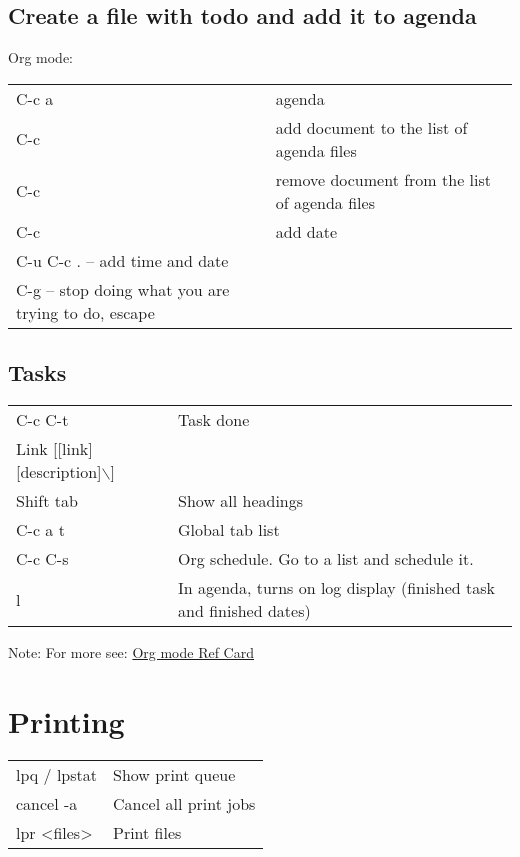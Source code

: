 \documentclass[11pt]{article}
\begin{document}
\subsection{Create a file with todo and add it to agenda}
\label{sec:org3df95be}
Org mode:\\
\begin{center}
\begin{tabular}{ll}
\hline
C-c a & agenda\\
C-c & add document to the list of agenda files\\
C-c & remove document from the list of agenda files\\
C-c & add date\\
C-u C-c . – add time and date & \\
C-g – stop doing what you are trying to do, escape & \\
\end{tabular}
\end{center}

\subsection{Tasks}
\label{sec:orgfc05d80}

\begin{center}
\begin{tabular}{ll}
C-c C-t & Task done\\
Link [[link][description]$\backslash$] & \\
Shift tab & Show all headings\\
C-c a t & Global tab list\\
C-c C-s & Org schedule. Go to a list and schedule it.\\
l & In agenda, turns on log display (finished task and finished dates)\\
\end{tabular}
\end{center}




Note: For more see: \href{orgcard.pdf}{Org mode Ref Card}\\

\section{Printing}
\label{sec:orgcdc0b56}
\begin{center}
\begin{tabular}{ll}
\hline
lpq / lpstat & Show print queue\\
cancel -a & Cancel all print jobs\\
lpr <files> & Print files\\
\hline
\end{tabular}
\end{center}
\end{document}
